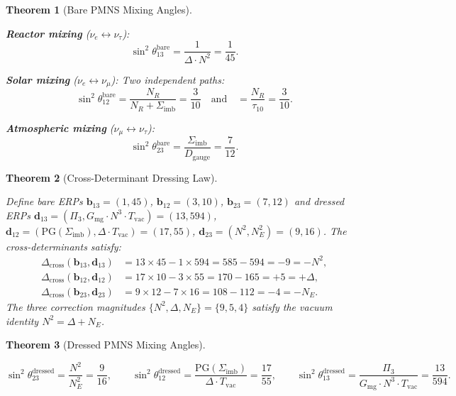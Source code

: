 \documentclass[11pt,letterpaper]{article}
\theoremstyle{plain}
\newtheorem{theorem}{Theorem}[section]
\theoremstyle{definition}
\theoremstyle{remark}
\newcommand{\Dcross}{\Delta_{\mathrm{cross}}}
\newcommand{\Dg}{D_{\mathrm{gauge}}}
\newcommand{\Sigimb}{\Sigma_{\mathrm{imb}}}
\newcommand{\PG}{\mathrm{PG}}
\newcommand{\Gmg}{G_{\mathrm{mg}}}
\newcommand{\Tvac}{T_{\mathrm{vac}}}
\newcommand{\tauX}{\tau_{10}}
\newcommand{\Pithree}{\Pi_3}
\begin{document}
\begin{theorem}[Bare PMNS Mixing Angles]\label{thm:pmns-bare}
\begin{rsbox}
\textbf{Reactor mixing} ($\nu_e\leftrightarrow\nu_\tau$):
\[
\sin^2\theta_{13}^{\mathrm{bare}}=\frac{1}{\Delta\cdot N^2}=\frac{1}{45}.
\]

\textbf{Solar mixing} ($\nu_e\leftrightarrow\nu_\mu$):
Two independent paths:
\[
\sin^2\theta_{12}^{\mathrm{bare}}
=\frac{N_R}{N_R+\Sigimb}=\frac{3}{10}
\quad\text{and}\quad
=\frac{N_R}{\tauX}=\frac{3}{10}.
\]

\textbf{Atmospheric mixing} ($\nu_\mu\leftrightarrow\nu_\tau$):
\[
\sin^2\theta_{23}^{\mathrm{bare}}=\frac{\Sigimb}{\Dg}=\frac{7}{12}.
\]
\end{rsbox}
\end{theorem}

\begin{theorem}[Cross-Determinant Dressing Law]\label{thm:dressing}
\begin{rsbox}
Define bare ERPs
$\mathbf{b}_{13}=(1,45)$, $\mathbf{b}_{12}=(3,10)$, $\mathbf{b}_{23}=(7,12)$
and dressed ERPs
$\mathbf{d}_{13}=(\Pithree,\Gmg\cdot N^3\cdot\Tvac)=(13,594)$,
$\mathbf{d}_{12}=(\PG(\Sigimb),\Delta\cdot\Tvac)=(17,55)$,
$\mathbf{d}_{23}=(N^2,N_E^2)=(9,16)$.
The cross-determinants satisfy:
\begin{align}
\Dcross(\mathbf{b}_{13},\mathbf{d}_{13})
  &=13\times45-1\times594=585-594=-9=-N^2,\label{eq:cd13}\\
\Dcross(\mathbf{b}_{12},\mathbf{d}_{12})
  &=17\times10-3\times55=170-165=+5=+\Delta,\label{eq:cd12}\\
\Dcross(\mathbf{b}_{23},\mathbf{d}_{23})
  &=9\times12-7\times16=108-112=-4=-N_E.\label{eq:cd23}
\end{align}
The three correction magnitudes $\{N^2,\Delta,N_E\}=\{9,5,4\}$ satisfy
the vacuum identity $N^2=\Delta+N_E$.
\end{rsbox}
\end{theorem}

\begin{theorem}[Dressed PMNS Mixing Angles]\label{thm:pmns-dressed}
\begin{rsbox}
\[
\sin^2\theta_{23}^{\mathrm{dressed}}
=\frac{N^2}{N_E^2}=\frac{9}{16},\qquad
\sin^2\theta_{12}^{\mathrm{dressed}}
=\frac{\PG(\Sigimb)}{\Delta\cdot\Tvac}=\frac{17}{55},\qquad
\sin^2\theta_{13}^{\mathrm{dressed}}
=\frac{\Pithree}{\Gmg\cdot N^3\cdot\Tvac}=\frac{13}{594}.
\]
\end{rsbox}
\end{theorem}
\end{document}
